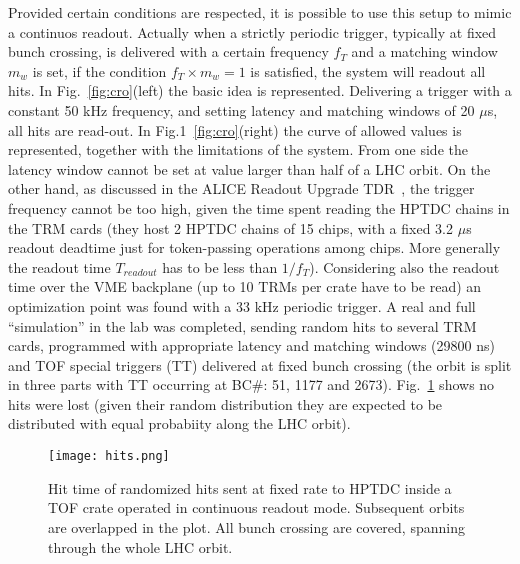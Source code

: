 Provided certain conditions are respected, it is possible to use this setup to mimic a continuos readout. Actually when a strictly periodic trigger, typically at fixed bunch crossing, is delivered with a certain frequency $f_T$ and a matching window $m_w$ is set, if the condition $f_{T} \times m_{w} = 1 $ is satisfied, the system will readout all hits. In Fig.~\ref{fig:cro}(left) the basic idea is represented. Delivering a trigger with a constant 50 kHz frequency, and setting latency and matching windows of 20 $\mu$s, all hits are read-out. In Fig.1~\ref{fig:cro}(right) the curve of allowed values is represented, together with the limitations of the system. From one side the latency window cannot be set at value larger than half of a LHC orbit. On the other hand, as discussed in the ALICE Readout Upgrade TDR~\cite{Antonioli:2013ppp}, the trigger frequency cannot be too high, given the time spent reading the HPTDC chains in the TRM cards (they host 2 HPTDC chains of 15 chips, with a fixed 3.2 $\mu$s readout deadtime just for token-passing operations among chips. More generally the readout time $T_{readout}$ has to be less than $1/f_{T}$). Considering also the readout time over the VME backplane (up to 10 TRMs per crate have to be read) an optimization point was found with a 33 kHz periodic trigger.  A real and full ``simulation'' in the lab was completed, sending random hits to several TRM cards, programmed with appropriate latency and matching windows (29800 ns) and TOF special triggers (TT) delivered at fixed bunch crossing (the orbit is split in three parts with TT occurring at BC\#: 51, 1177 and 2673). Fig.~\ref{fig:hits} shows no hits were lost (given their random distribution they are expected to be distributed with equal probabiity along the LHC orbit).

\begin{figure}[t!]
\centering
\texttt{[image: hits.png]} 
\caption{Hit time of randomized hits sent at fixed rate to HPTDC inside a TOF crate operated in continuous readout mode. Subsequent orbits are overlapped in the plot. All bunch crossing are covered, spanning through the whole LHC orbit.}
\label{fig:hits}
\end{figure}


